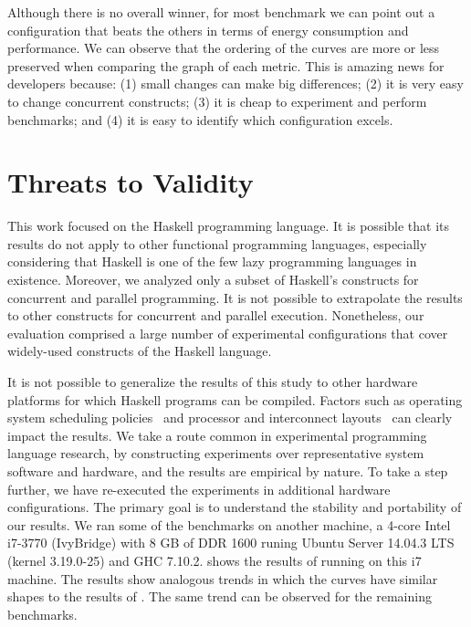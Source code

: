 Although there is no overall winner, for most benchmark we can point out a configuration that beats the others in terms of energy consumption and performance. We can observe that the ordering of the curves are more or less preserved when comparing the graph of each metric. This is amazing news for developers because: (1) small changes can make big differences; (2) it is very easy to change concurrent constructs; (3) it is cheap to experiment and perform benchmarks; and (4) it is easy to identify which configuration excels.


\section{Threats to Validity}\label{sec:threats}
This work focused on the Haskell programming language. It is possible that its results do not apply to other functional programming languages, especially considering that Haskell is one of the few lazy programming languages in existence. Moreover, we analyzed only a subset of Haskell's constructs for concurrent and parallel programming. It is not possible to extrapolate the results to other constructs for concurrent and parallel execution. Nonetheless, our evaluation comprised a large number of experimental configurations that cover widely-used constructs of the Haskell language.

It is not possible to generalize the results of this study to other hardware platforms for which Haskell programs can be compiled. Factors such as operating system scheduling policies~\cite{yuan:2003} and processor and interconnect layouts~\cite{solernou:2013} can clearly impact the results. We take a route common in experimental programming language research, by constructing experiments over representative system software and hardware, and the results are empirical by nature. To take a step further, we have re-executed the experiments in additional hardware configurations. The primary goal is to understand the stability and portability of our results. We ran some of the benchmarks on another machine, a 4-core Intel i7-3770 (IvyBridge) with 8 GB of DDR 1600 runing Ubuntu Server 14.04.3 LTS (kernel 3.19.0-25) and GHC 7.10.2.  shows the results of \mandelbrot running on this i7 machine. The results show analogous trends in which the curves have similar shapes to the results of . The same trend can be observed for the remaining benchmarks.

